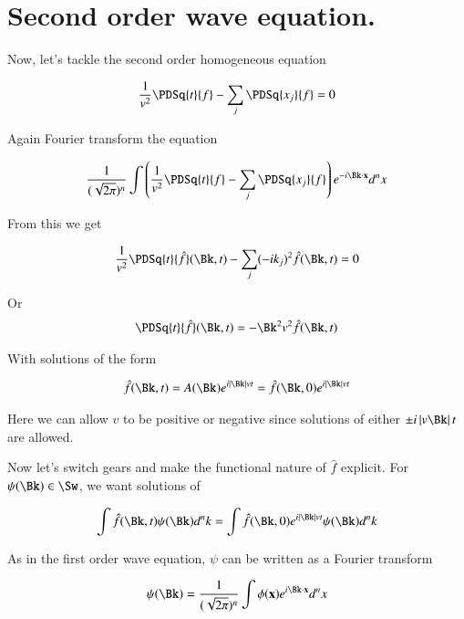 \section{Second order wave equation. }

Now, let's tackle the second order homogeneous equation

\begin{align}\label{eqn:distributions:secondOrderWave}
\inv{v^2} \PDSq{t}{f} - \sum_j \PDSq{x_j}{f} = 0
\end{align}

Again Fourier transform the equation

\begin{align*}
\frac{1}{(\sqrt{2\pi})^n} \int \left( \inv{v^2} \PDSq{t}{f} - \sum_j \PDSq{x_j}{f} \right) e^{-i \Bk \cdot \Bx } d^n x \\
\end{align*}

From this we get 

\begin{align*}
\inv{v^2} \PDSq{t}{\hat{f}}(\Bk,t) - \sum_j (-i k_j)^2 \hat{f}(\Bk,t) = 0
\end{align*}

Or
\begin{align*}
\PDSq{t}{\hat{f}}(\Bk,t) = - \Bk^2 v^2 \hat{f}(\Bk,t) 
\end{align*}

With solutions of the form

\begin{align*}
\hat{f}(\Bk,t) = A(\Bk) e^{i \Abs{\Bk} v t} = \hat{f}(\Bk,0) e^{i \Abs{\Bk} v t}
\end{align*}

Here we can allow $v$ to be positive or negative since solutions of either $\pm i \Abs{v \Bk} t$ are allowed.

Now let's switch gears and make the functional nature of $\hat{f}$ explicit.  For $\psi(\Bk) \in \Sw$, we want solutions
of

\begin{align*}
\int \hat{f}(\Bk,t) \psi(\Bk) d^n k = \int \hat{f}(\Bk,0) e^{i \Abs{\Bk} v t} \psi(\Bk) d^n k 
\end{align*}

As in the first order wave equation, $\psi$ can be written as a Fourier transform 

\begin{align}\label{eqn:distributions:fourierWaveTx}
\psi(\Bk) = \frac{1}{(\sqrt{2\pi})^n} \int \phi(\Bx) e^{i \Bk \cdot \Bx } d^n x 
\end{align}

